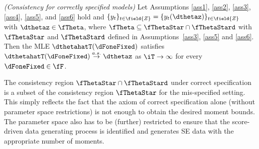 
\begin{cor} \label{cor1}
\emph{(Consistency for correctly specified models)}
    Let Assumptions \ref{ass1}, \ref{ass2}, \ref{ass3}, \ref{ass4}, \ref{ass5}, and \ref{ass6} 
hold and $\{y_{t}\}_{t \in \field{Z}} = \{y_{t}(\dthetaz)\}_{t\in \field{Z}}$ with
$\dthetaz \in \fTheta$, where 
$\fTheta \subseteq \fThetaStar \cap  \fThetaStard$ 
with $\fThetaStar$ and $\fThetaStard$ defined in Assumptions~\ref{ass3}, \ref{ass5} and \ref{ass6}.
Then the MLE $\dthetahatT(\dFoneFixed)$ satisfies  $\dthetahatT(\dFoneFixed) \stackrel{a.s.}{\to}  \dthetaz$ as $\iT \to \infty$ for every $\dFoneFixed \in \fF$. 
\end{cor}


The consistency region $\fThetaStar \cap  \fThetaStard$ under correct specification is a subset of the consistency region $\fThetaStar$ for the mis-specified setting. This simply reflects the fact that the axiom of correct specification alone (without parameter space restrictions) is not enough to obtain the desired moment bounds. The parameter space also has to be (further) restricted to ensure that the score-driven data generating process is identified and generates SE data with the appropriate number of moments. 

